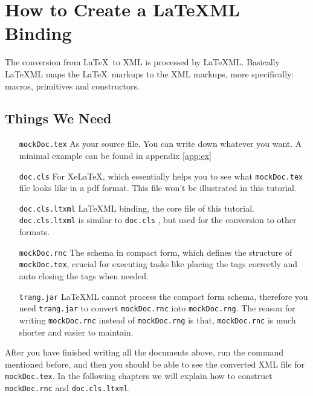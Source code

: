\documentclass[a4paper]{article}
\begin{document}
\section{How to Create a LaTeXML Binding}
The conversion from \LaTeX\ to XML is processed by \LaTeX ML. Basically \LaTeX ML maps the \LaTeX\ markups to the XML markups, more specifically: macros, primitives and constructors. 
\subsection{Things We Need}
\begin{itemize}
\item[\texttt{mockDoc.tex}] As your source file. You can write down whatever you want. A
  minimal example can be found in appendix
  \ref{app:ex}
\item[\texttt{doc.cls}] For Xe\LaTeX, which essentially helps you to see what \texttt{mockDoc.tex} file looks like in a pdf format. This file won't be illustrated in this tutorial.
\item[\texttt{doc.cls.ltxml}] \LaTeX ML binding, the core file of this tutorial. \texttt{doc.cls.ltxml} is similar to \texttt{doc.cls} , but used for the conversion to other formats. 
\item[\texttt{mockDoc.rnc}] The schema in compact form, which defines the structure of \texttt{mockDoc.tex}, crucial for executing tasks like placing the tags correctly and auto closing the tags when needed. 
\item[\texttt{trang.jar}] \LaTeX ML cannot process the compact form schema, therefore you need \texttt{trang.jar} to convert \texttt{mockDoc.rnc} into \texttt{mockDoc.rng}. The reason for writing \texttt{mockDoc.rnc} instead of \texttt{mockDoc.rng} is that, \texttt{mockDoc.rnc} is much shorter and easier to maintain. 
\end{itemize}
After you have finished writing all the documents above, run the command mentioned before, and then you should be able to see the converted XML file for \texttt{mockDoc.tex}. In the following chapters we will explain how to construct \texttt{mockDoc.rnc} and \texttt{doc.cls.ltxml}.
\end{document}
